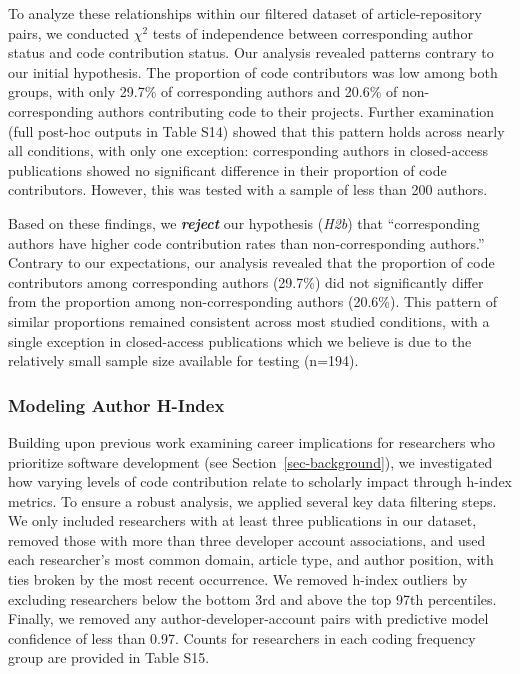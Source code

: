\documentclass[
  number,
  3p,
  onecolumn]{elsarticle}
\begin{document}
To analyze these relationships within our filtered dataset of
article-repository pairs, we conducted $\chi^2$ tests of independence
between corresponding author status and code contribution status. Our
analysis revealed patterns contrary to our initial hypothesis. The
proportion of code contributors was low among both groups, with only
29.7\% of corresponding authors and 20.6\% of non-corresponding authors
contributing code to their projects. Further examination (full post-hoc
outputs in Table S14) showed that this pattern holds across nearly all
conditions, with only one exception: corresponding authors in
closed-access publications showed no significant difference in their
proportion of code contributors. However, this was tested with a sample
of less than 200 authors.

Based on these findings, we \textbf{\emph{reject}} our hypothesis
(\emph{H2b}) that ``corresponding authors have higher code contribution
rates than non-corresponding authors.'' Contrary to our expectations,
our analysis revealed that the proportion of code contributors among
corresponding authors (29.7\%) did not significantly differ from the
proportion among non-corresponding authors (20.6\%). This pattern of
similar proportions remained consistent across most studied conditions,
with a single exception in closed-access publications which we believe
is due to the relatively small sample size available for testing
(n=194).

\subsubsection{Modeling Author H-Index}\label{modeling-author-h-index}

Building upon previous work examining career implications for
researchers who prioritize software development (see
Section~\ref{sec-background}), we investigated how varying levels of
code contribution relate to scholarly impact through h-index metrics. To
ensure a robust analysis, we applied several key data filtering steps.
We only included researchers with at least three publications in our
dataset, removed those with more than three developer account
associations, and used each researcher's most common domain, article
type, and author position, with ties broken by the most recent
occurrence. We removed h-index outliers by excluding researchers below
the bottom 3rd and above the top 97th percentiles. Finally, we removed
any author-developer-account pairs with predictive model confidence of
less than 0.97. Counts for researchers in each coding frequency group
are provided in Table S15.
\end{document}
